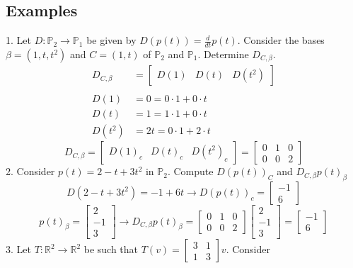 \begin{enumerate}
\subsection{Examples}
1. Let $D : \mathbb{P}_2 \rightarrow \mathbb{P}_1$ be given by $D(p(t)) = 
\frac{d}{dt} p(t)$. Consider the bases $\beta = (1, t, t^2)$ and 
$C = (1, t)$ of $\mathbb{P}_2$ and $\mathbb{P}_1$. Determine 
$D_{C, \beta}$. 
\[
  \begin{aligned}
    D_{C, \beta} &= \begin{bmatrix} D(1) & D(t) & D(t^2) \end{bmatrix} \\\\
    D(1) &= 0 = 0 \cdot 1 + 0 \cdot t \\ 
    D(t) &= 1 = 1 \cdot 1 + 0 \cdot t \\
    D(t^2) &= 2t = 0 \cdot 1 + 2 \cdot t
  \end{aligned}
\] 
\[
  D_{C, \beta} = \begin{bmatrix} D(1)_c & D(t)_c & D(t^2)
_c \end{bmatrix} = \begin{bmatrix} 0 & 1 & 0 \\ 0 & 0 & 2 
\end{bmatrix}
\]
2. Consider $p(t) = 2 - t + 3t^2$ in $\mathbb{P}_2$. Compute 
$D(p(t))_C$ and $D_{C, \beta}p(t)_\beta$ 
\[
  D(2 - t + 3t^2) = -1 + 6t \rightarrow D(p(t))_c = \begin{bmatrix}
     -1 \\ 6 \end{bmatrix}
\]
\[
  p(t)_\beta = \begin{bmatrix} 2 \\ -1 \\ 3 \end{bmatrix} \rightarrow 
  D_{C, \beta}p(t)_\beta = \begin{bmatrix} 0 & 1 & 0 \\ 0 & 0 & 2 
    \end{bmatrix} \begin{bmatrix} 2 \\ -1 \\ 3 \end{bmatrix} = 
    \begin{bmatrix} -1 \\ 6 \end{bmatrix}
\]
3. Let $T : \mathbb{R}^2 \rightarrow \mathbb{R}^2$ be such that 
    $T(v) = \begin{bmatrix} 3 & 1 \\ 1 & 3 \end{bmatrix}v$. Consider 

\end{enumerate}
